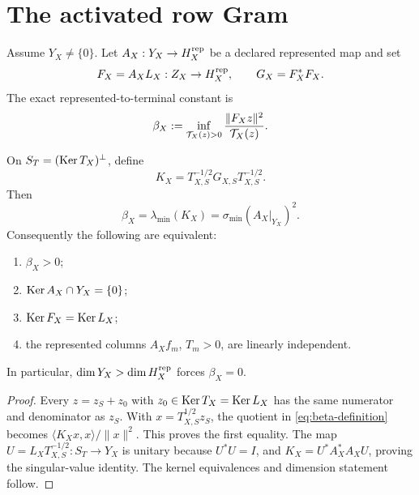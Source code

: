 \section{The activated row Gram}

Assume \(Y_X\ne\{0\}\). Let \(A_X:Y_X\to H_X^{\rm rep}\) be a declared
represented map and set
\[
 F_X=A_XL_X:Z_X\to H_X^{\rm rep},\qquad
 G_X=F_X^*F_X.
\]
The exact represented-to-terminal constant is
\begin{equation}\label{eq:beta-definition}
 \beta_X
 :=\inf_{\mathcal T_X(z)>0}
 \frac{\|F_Xz\|^2}{\mathcal T_X(z)}.
\end{equation}

\begin{theorem}\label{thm:row-gram}
On \(S_T=(\operatorname{Ker} T_X)^\perp\), define
\begin{equation}\label{eq:normalized-row-gram}
 K_X=T_{X,S}^{-1/2}G_{X,S}T_{X,S}^{-1/2}.
\end{equation}
Then
\begin{equation}\label{eq:beta-eigenvalue}
 \boxed{\quad
 \beta_X=\lambda_{\min}(K_X)
 =\sigma_{\min}(A_X|_{Y_X})^2.
 \quad}
\end{equation}
Consequently the following are equivalent:
\begin{enumerate}[label=(\roman*)]
\item \(\beta_X>0\);
\item \(\operatorname{Ker} A_X\cap Y_X=\{0\}\);
\item \(\operatorname{Ker} F_X=\operatorname{Ker} L_X\);
\item the represented columns \(A_Xf_m\), \(T_m>0\), are linearly
independent.
\end{enumerate}
In particular, \(\dim Y_X>\dim H_X^{\rm rep}\) forces \(\beta_X=0\).
\end{theorem}

\begin{proof}
Every \(z=z_S+z_0\) with \(z_0\in\operatorname{Ker} T_X=\operatorname{Ker} L_X\) has the same numerator
and denominator as \(z_S\). With \(x=T_{X,S}^{1/2}z_S\), the quotient in
\eqref{eq:beta-definition} becomes
\(\langle K_Xx,x\rangle/\|x\|^2\). This proves the first equality. The map
\(U=L_XT_{X,S}^{-1/2}:S_T\to Y_X\) is unitary because \(U^*U=I\), and
\(K_X=U^*A_X^*A_XU\), proving the singular-value identity. The kernel
equivalences and dimension statement follow.
\end{proof}

